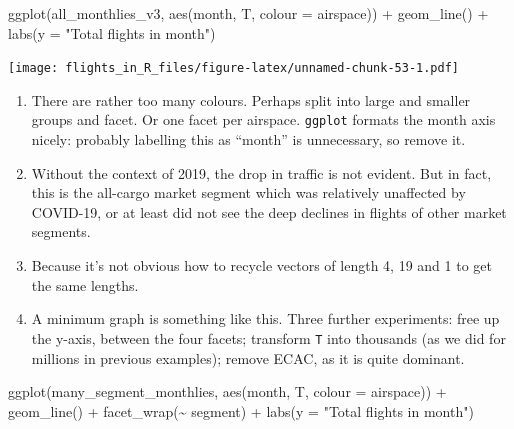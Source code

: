 \documentclass[
]{book}
\newenvironment{Shaded}{\begin{snugshade}}{\end{snugshade}}
\newcommand{\AttributeTok}[1]{\textcolor[rgb]{0.77,0.63,0.00}{#1}}
\newcommand{\FunctionTok}[1]{\textcolor[rgb]{0.00,0.00,0.00}{#1}}
\newcommand{\NormalTok}[1]{#1}
\newcommand{\SpecialCharTok}[1]{\textcolor[rgb]{0.00,0.00,0.00}{#1}}
\newcommand{\StringTok}[1]{\textcolor[rgb]{0.31,0.60,0.02}{#1}}
\providecommand{\tightlist}{%
  \setlength{\itemsep}{0pt}\setlength{\parskip}{0pt}}
\begin{document}
\begin{Shaded}
\begin{Highlighting}[]
\FunctionTok{ggplot}\NormalTok{(all\_monthlies\_v3,}
       \FunctionTok{aes}\NormalTok{(month, T, }\AttributeTok{colour =}\NormalTok{ airspace)) }\SpecialCharTok{+} 
  \FunctionTok{geom\_line}\NormalTok{() }\SpecialCharTok{+}
  \FunctionTok{labs}\NormalTok{(}\AttributeTok{y =} \StringTok{"Total flights in month"}\NormalTok{)}
\end{Highlighting}
\end{Shaded}

\texttt{[image: flights\_in\_R\_files/figure-latex/unnamed-chunk-53-1.pdf]}

\begin{enumerate}
\def\labelenumi{\arabic{enumi})}
\setcounter{enumi}{4}
\tightlist
\item
  There are rather too many colours. Perhaps split into large and smaller groups and facet. Or one facet per airspace. \texttt{ggplot} formats the month axis nicely: probably labelling this as ``month'' is unnecessary, so remove it.
\item
  Without the context of 2019, the drop in traffic is not evident. But in fact, this is the all-cargo market segment which was relatively unaffected by COVID-19, or at least did not see the deep declines in flights of other market segments.
\item
  Because it's not obvious how to recycle vectors of length 4, 19 and 1 to get the same lengths.
\item
  A minimum graph is something like this. Three further experiments: free up the y-axis, between the four facets; transform \texttt{T} into thousands (as we did for millions in previous examples); remove ECAC, as it is quite dominant.
\end{enumerate}

\begin{Shaded}
\begin{Highlighting}[]
\FunctionTok{ggplot}\NormalTok{(many\_segment\_monthlies,}
       \FunctionTok{aes}\NormalTok{(month, T, }\AttributeTok{colour =}\NormalTok{ airspace)) }\SpecialCharTok{+} 
  \FunctionTok{geom\_line}\NormalTok{() }\SpecialCharTok{+}
  \FunctionTok{facet\_wrap}\NormalTok{(}\SpecialCharTok{\textasciitilde{}}\NormalTok{ segment) }\SpecialCharTok{+}
  \FunctionTok{labs}\NormalTok{(}\AttributeTok{y =} \StringTok{"Total flights in month"}\NormalTok{)}
\end{Highlighting}
\end{Shaded}
\end{document}
